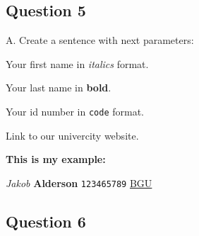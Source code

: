 \documentclass[
  letterpaper,
  DIV=11,
  numbers=noendperiod]{scrartcl}
\begin{document}
\hypertarget{question-5}{%
\subsection{Question 5}\label{question-5}}

A. Create a sentence with next parameters:

Your first name in \emph{italics} format.

Your last name in \textbf{bold}.

Your id number in \texttt{code} format.

Link to our univercity website.

\textbf{This is my example:}

\emph{Jakob} \textbf{Alderson} \texttt{123465789}
\href{https://in.bgu.ac.il/Pages/default.aspx}{BGU}

\hypertarget{question-6}{%
\subsection{Question 6}\label{question-6}}
\end{document}
